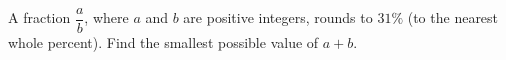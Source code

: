A fraction $\dfrac ab$, where $a$ and $b$ are positive integers, rounds to $31\%$ (to the nearest whole percent). Find the smallest possible value of $a+b$.
